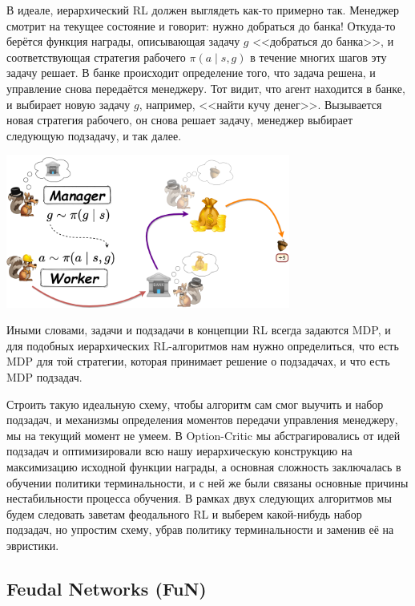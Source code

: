 \begin{example}
В идеале, иерархический RL должен выглядеть как-то примерно так. Менеджер смотрит на текущее состояние и говорит: нужно добраться до банка! Откуда-то берётся функция награды, описывающая задачу $g$ <<добраться до банка>>, и соответствующая стратегия рабочего $\pi(a \mid s, g)$ в течение многих шагов эту задачу решает. В банке происходит определение того, что задача решена, и управление снова передаётся менеджеру. Тот видит, что агент находится в банке, и выбирает новую задачу $g$, например, <<найти кучу денег>>. Вызывается новая стратегия рабочего, он снова решает задачу, менеджер выбирает следующую подзадачу, и так далее.

\begin{center}
    \includegraphics[width=0.7\textwidth]{Images/HRL4}
\end{center}
\end{example}

Иными словами, задачи и подзадачи в концепции RL всегда задаются MDP, и для подобных иерархических RL-алгоритмов нам нужно определиться, что есть MDP для той стратегии, которая принимает решение о подзадачах, и что есть MDP подзадач.

Строить такую идеальную схему, чтобы алгоритм сам смог выучить и набор подзадач, и механизмы определения моментов передачи управления менеджеру, мы на текущий момент не умеем. В Option-Critic мы абстрагировались от идей подзадач и оптимизировали всю нашу иерархическую конструкцию на максимизацию исходной функции награды, а основная сложность заключалась в обучении политики терминальности, и с ней же были связаны основные причины нестабильности процесса обучения. В рамках двух следующих алгоритмов мы будем следовать заветам феодального RL и выберем какой-нибудь набор подзадач, но упростим схему, убрав политику терминальности и заменив её на эвристики.

\subsection{Feudal Networks (FuN)}

